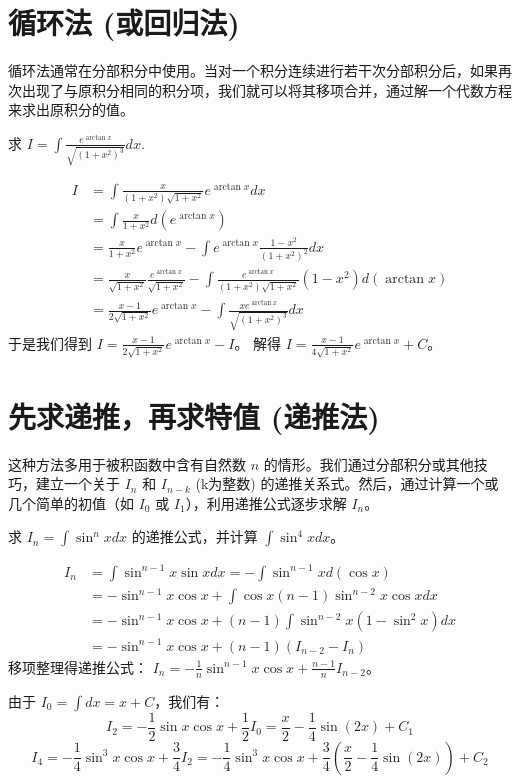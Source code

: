 \documentclass[lang=cn,newtx,10pt,scheme=chinese]{elegantbook}
\begin{document}
\section{循环法 (或回归法)}
循环法通常在分部积分中使用。当对一个积分连续进行若干次分部积分后，如果再次出现了与原积分相同的积分项，我们就可以将其移项合并，通过解一个代数方程来求出原积分的值。

\begin{example}
求 $I = \int \frac{e^{\arctan x}}{\sqrt{(1+x^2)^3}} dx$.
\end{example}
\begin{solution}
$$
\begin{aligned}
I &= \int \frac{x}{(1+x^2)\sqrt{1+x^2}} e^{\arctan x} dx \\
&= \int \frac{x}{1+x^2} d(e^{\arctan x}) \\
&= \frac{x}{1+x^2} e^{\arctan x} - \int e^{\arctan x} \frac{1-x^2}{(1+x^2)^2} dx \\
&= \frac{x}{\sqrt{1+x^2}} \frac{e^{\arctan x}}{\sqrt{1+x^2}} - \int \frac{e^{\arctan x}}{(1+x^2)\sqrt{1+x^2}} (1-x^2) d(\arctan x) \\
&= \frac{x-1}{2\sqrt{1+x^2}} e^{\arctan x} - \int \frac{x e^{\arctan x}}{\sqrt{(1+x^2)^3}} dx
\end{aligned}
$$
于是我们得到 $I = \frac{x-1}{2\sqrt{1+x^2}} e^{\arctan x} - I$。
解得 $I = \frac{x-1}{4\sqrt{1+x^2}} e^{\arctan x} + C$。
\end{solution}

\section{先求递推，再求特值 (递推法)}
这种方法多用于被积函数中含有自然数 $n$ 的情形。我们通过分部积分或其他技巧，建立一个关于 $I_n$ 和 $I_{n-k}$ (k为整数) 的递推关系式。然后，通过计算一个或几个简单的初值（如 $I_0$ 或 $I_1$），利用递推公式逐步求解 $I_n$。

\begin{example}
求 $I_n = \int \sin^n x dx$ 的递推公式，并计算 $\int \sin^4 x dx$。
\end{example}
\begin{solution}
$$
\begin{aligned}
I_n &= \int \sin^{n-1} x \sin x dx = -\int \sin^{n-1} x d(\cos x) \\
&= -\sin^{n-1} x \cos x + \int \cos x (n-1) \sin^{n-2} x \cos x dx \\
&= -\sin^{n-1} x \cos x + (n-1) \int \sin^{n-2} x (1-\sin^2 x) dx \\
&= -\sin^{n-1} x \cos x + (n-1) (I_{n-2} - I_n)
\end{aligned}
$$
移项整理得递推公式： $I_n = -\frac{1}{n}\sin^{n-1} x \cos x + \frac{n-1}{n} I_{n-2}$。

由于 $I_0 = \int dx = x + C$，我们有：
$$
I_2 = -\frac{1}{2}\sin x \cos x + \frac{1}{2}I_0 = \frac{x}{2} - \frac{1}{4}\sin(2x) + C_1
$$
$$
I_4 = -\frac{1}{4}\sin^3 x \cos x + \frac{3}{4}I_2 = -\frac{1}{4}\sin^3 x \cos x + \frac{3}{4}\left(\frac{x}{2} - \frac{1}{4}\sin(2x)\right) + C_2
$$
\end{solution}
\end{document}
